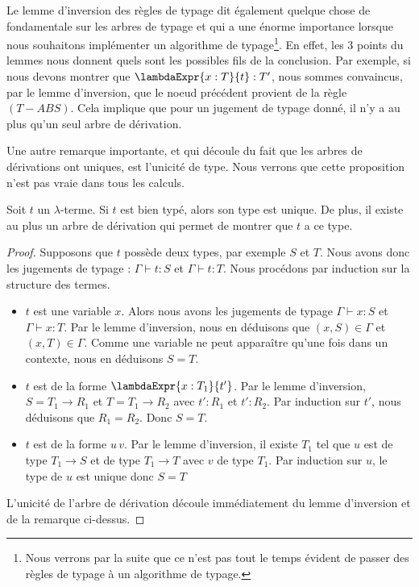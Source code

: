 Le lemme d'inversion des règles de typage dit également quelque chose de
fondamentale sur les arbres de typage et qui a une énorme importance lorsque
nous souhaitons implémenter un algorithme de typage\footnote{Nous verrons par la
suite que ce n'est pas tout le temps évident de passer des règles de typage à un
algorithme de typage.}. En effet, les 3 points du
lemmes nous donnent quels sont les possibles fils de la conclusion. Par
exemple, si nous devons montrer que $\lambdaExpr{x : T}{t} : T'$, nous sommes
convaincus, par le lemme d'inversion, que le noeud précédent provient de la
règle $(T-ABS)$. Cela implique que pour un jugement de typage donné, il n'y a au
plus qu'un seul arbre de dérivation.

Une autre remarque importante, et qui découle du fait que les arbres de
dérivations ont uniques, est l'unicité de type. Nous verrons que cette
proposition n'est pas vraie dans tous les calculs.

\begin{theorem} 
  \label{chap1-thm:type-unicity}
  Soit $t$ un $\lambda$-terme. Si $t$ est bien typé, alors son type est unique. De plus, il existe au
  plus un arbre de dérivation qui permet de montrer que $t$ a ce type.
\end{theorem}

\begin{proof}
  Supposons que $t$ possède deux types, par exemple $S$ et $T$. Nous avons donc les
  jugements de typage : $\Gamma \vdash t : S$ et $\Gamma \vdash t : T$. Nous procédons
  par induction sur la structure des termes.
  \begin{itemize}
   \item $t$ est une variable $x$. Alors nous avons les jugements de typage $\Gamma \vdash x : S$ et $\Gamma
     \vdash x : T$. Par le lemme d'inversion, nous en déduisons que $(x, S) \in
     \Gamma$ et $(x, T) \in \Gamma$. Comme une variable ne peut apparaître
     qu'une fois dans un contexte, nous en déduisons $S = T$.

   \item $t$ est de la forme $\lambdaExpr{x : T_{1}}{t'}$. Par le lemme
     d'inversion, $S = T_{1} \rightarrow R_{1}$ et $T = T_{1} \rightarrow
     R_{2}$ avec $t' : R_{1}$ et $t' : R_{2}$. Par induction sur $t'$, nous
     déduisons que $R_{1} = R_{2}$. Donc $S = T$.

   \item $t$ est de la forme $u \, v$. Par le lemme d'inversion, il existe
     $T_{1}$ tel que $u$ est de type $T_{1} \rightarrow S$ et de type $T_{1}
     \rightarrow T$ avec $v$ de type $T_{1}$. Par induction
     sur $u$, le type de $u$ est unique donc $S = T$
   \end{itemize}

   L'unicité de l'arbre de dérivation découle immédiatement du lemme d'inversion
   et de la remarque ci-dessus.
\end{proof}

